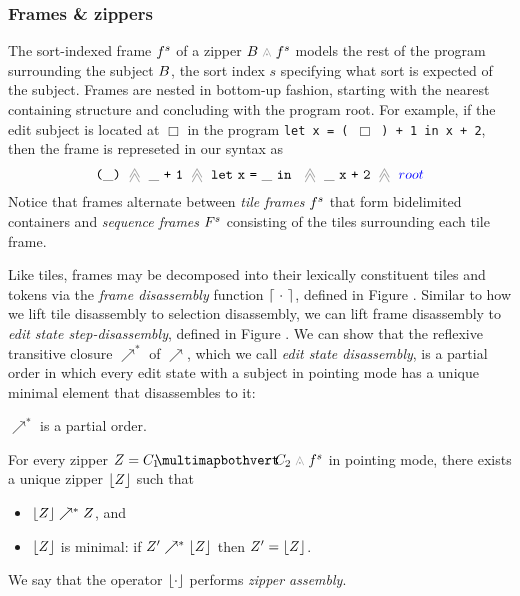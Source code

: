 \subsubsection{Frames \& zippers}
The sort-indexed frame $f^s$ of a zipper
$\zipper{\subject}{\tfrelem^s}$ models the rest of
the program surrounding the subject $B$,
the sort index $s$ specifying what sort is expected
of the subject.
Frames are nested in bottom-up fashion, starting
with the nearest containing structure and concluding
with the program root.
For example, if the edit subject is located at $\Box$
in the program \texttt{let x = ( $\Box$ ) + 1 in x + 2},
then the frame is represeted in our syntax as
\[
  \tframelit{
    \sparen{\_}
  }{
    \tframelit{
      \_\splus{}{\texttt{1}}
    }{
      \tframelit{
        \slet{\texttt{x}}{\_}{}
      }{
        \tframelit{
          \_\ \splus{\texttt{x}}{\texttt{2}}
        }{
          \note{root}
        }
      }
    }
  }
\]
Notice that frames alternate between \emph{tile
frames} $f^s$ that form bidelimited containers and
\emph{sequence frames} $F^s$ consisting of the tiles
surrounding each tile frame.


% 
% 



Like tiles, frames may be decomposed into their
lexically constituent tiles and tokens via the
\emph{frame disassembly} function $\left\lceil~\cdot~\right\rceil$,
defined in Figure .
Similar to how we lift tile disassembly to selection
disassembly, we can lift frame disassembly to
\emph{edit state step-disassembly}, defined in Figure .
We can show that the reflexive transitive closure
$\nearrow^*$ of $\nearrow$, which we call \emph{edit state disassembly},
is a partial order in
which every edit state with a subject in pointing mode
has a unique minimal element that disassembles to it:
\begin{lemma}
  $\nearrow^*$ is a partial order.
\end{lemma}
\begin{lemma}\label{lemma:unique-parsed-editstate}
  For every zipper $\editState = \zipper{\pointing{\selection_1}{\selection_2}}{\tfrelem^s}$
  in pointing mode,
  there exists a unique zipper $\left\lfloor Z\right\rfloor$ such that
  \begin{itemize}
  \item $\left\lfloor Z\right\rfloor \nearrow^* Z$, and
  \item $\left\lfloor Z\right\rfloor$ is minimal: if $Z' \nearrow^* \left\lfloor Z\right\rfloor$ then $Z' = \left\lfloor Z\right\rfloor$.
  \end{itemize}
\end{lemma}
\noindent
We say that the operator $\left\lfloor\cdot\right\rfloor$ performs \emph{zipper assembly}.

